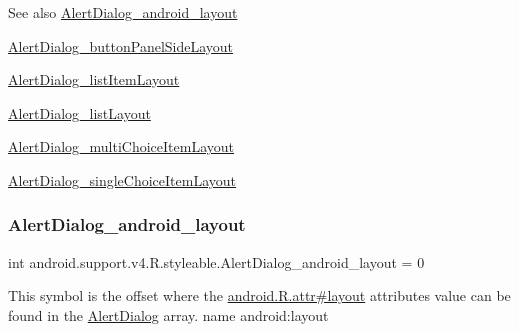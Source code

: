 \begin{DoxySeeAlso}{See also}
\hyperlink{classandroid_1_1support_1_1v4_1_1R_1_1styleable_ae862e498d32925004193b65ed1bf4062}{Alert\+Dialog\+\_\+android\+\_\+layout} 

\hyperlink{classandroid_1_1support_1_1v4_1_1R_1_1styleable_aa80044c84d26c170ed55ef0d1b748000}{Alert\+Dialog\+\_\+button\+Panel\+Side\+Layout} 

\hyperlink{classandroid_1_1support_1_1v4_1_1R_1_1styleable_abd795c00cd69a69a92b9953b1ebe8394}{Alert\+Dialog\+\_\+list\+Item\+Layout} 

\hyperlink{classandroid_1_1support_1_1v4_1_1R_1_1styleable_a2d34538b1db2a88b217f6cd6dc60a8ff}{Alert\+Dialog\+\_\+list\+Layout} 

\hyperlink{classandroid_1_1support_1_1v4_1_1R_1_1styleable_a543519cd3d3b938c48d9d1c6133eba4b}{Alert\+Dialog\+\_\+multi\+Choice\+Item\+Layout} 

\hyperlink{classandroid_1_1support_1_1v4_1_1R_1_1styleable_ad05c2beadd3ba3e9770f1f84ec112b92}{Alert\+Dialog\+\_\+single\+Choice\+Item\+Layout} 
\end{DoxySeeAlso}
\mbox{\label{classandroid_1_1support_1_1v4_1_1R_1_1styleable_ae862e498d32925004193b65ed1bf4062}} 
\subsubsection{\texorpdfstring{Alert\+Dialog\+\_\+android\+\_\+layout}{AlertDialog\_android\_layout}}
{\footnotesize\ttfamily int android.\+support.\+v4.\+R.\+styleable.\+Alert\+Dialog\+\_\+android\+\_\+layout = 0\hspace{0.3cm}{\ttfamily [static]}}

This symbol is the offset where the \hyperlink{}{android.\+R.\+attr\#layout} attribute\textquotesingle{}s value can be found in the \hyperlink{classandroid_1_1support_1_1v4_1_1R_1_1styleable_a5116e3c5b33ab9db032c1574d2588f5e}{Alert\+Dialog} array.  name android\+:layout \mbox{\label{classandroid_1_1support_1_1v4_1_1R_1_1styleable_aa80044c84d26c170ed55ef0d1b748000}} 
